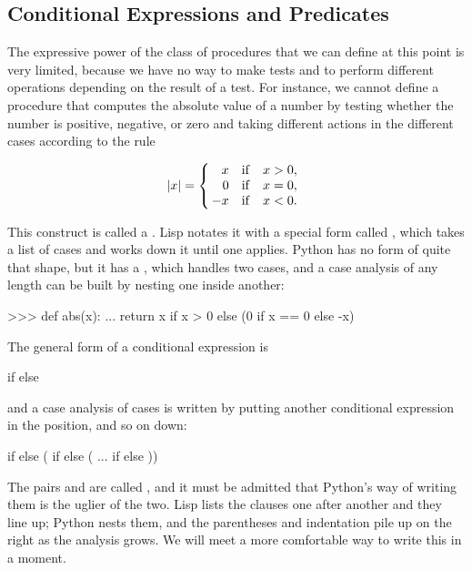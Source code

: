\subsection{Conditional Expressions and Predicates}
\label{Section 1.1.6}

The expressive power of the class of procedures that we can define at this
point is very limited, because we have no way to make tests and to perform
different operations depending on the result of a test. For instance, we
cannot define a procedure that computes the absolute value of a number by
testing whether the number is positive, negative, or zero and taking different
actions in the different cases according to the rule

$$
 |x| = \left\{ \begin{array}{r@{\quad \mathrm{if} \quad}l}
        x  &  x > 0, \\
	0  &  x = 0, \\
  \!\! -x  &  x < 0. \end{array} \right.
$$

This construct is called a .  Lisp notates it with a
special form called , which takes a list of cases and works down it
until one applies.  Python has no form of quite that shape, but it has a
, which handles two cases, and a case analysis
of any length can be built by nesting one inside another:

\begin{codeBlock}
>>> def abs(x):
...     return x if x > 0 else (0 if x == 0 else -x)
\end{codeBlock}

\noindent
The general form of a conditional expression is

\begin{syntaxForm}
 if  else 
\end{syntaxForm}

\noindent
and a case analysis of  cases is written by putting another conditional
expression in the  position, and so on down:

\begin{syntaxForm}
 if  else (
     if  else (
        ...
         if  else ))
\end{syntaxForm}

\noindent
The pairs  and  are called , and it must be
admitted that Python's way of writing them is the uglier of the two.  Lisp
lists the clauses one after another and they line up; Python nests them, and
the parentheses and indentation pile up on the right as the analysis grows.  We
will meet a more comfortable way to write this in a moment.

